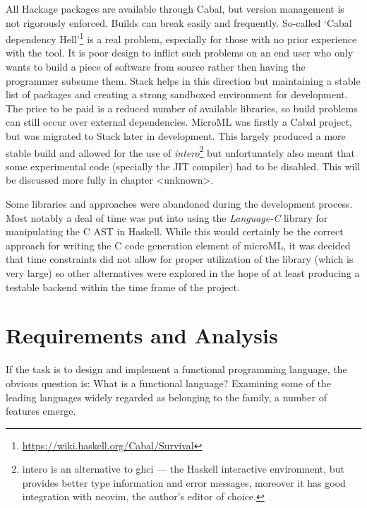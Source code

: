 \documentclass[12pt, a4paper]{report}
\begin{document}
All Hackage packages are available through Cabal, but version management is not rigorously
enforced. Builds can break easily and frequently. So-called `Cabal dependency
Hell'\footnote{\url{https://wiki.haskell.org/Cabal/Survival}} is a real problem, especially for
those with no prior experience with the tool. It is poor design to inflict such problems on an end
user who only wants to build a piece of software from source rather then having the programmer
subsume them. Stack helps in this direction but maintaining a stable list of packages and creating a
strong sandboxed environment for development. The price to be paid is a reduced number of available
libraries, so build problems can still occur over external dependencies. MicroML was firstly a Cabal
project, but was migrated to Stack later in development. This largely produced a more stable
build and allowed for the use of \textit{intero}\footnote{intero is an alternative to ghci --- the
    Haskell interactive environment, but provides better type information and error messages,
    moreover it has good integration with neovim, the author's editor of choice.} but unfortunately also meant that some experimental
code (specially the JIT compiler) had to be disabled. This will be discussed more fully in chapter
<unknown>.

Some libraries and approaches were abandoned during the development process. Most notably a deal of
time was put into using the \textit{Language-C} library for manipulating the C AST in Haskell. While
this would certainly be the correct approach for writing the C code generation element of microML,
it was decided that time constraints did not allow for proper utilization of the library (which is
very large) so other alternatives were explored in the hope of at least producing a testable backend
within the time frame of the project. 


\chapter{Requirements and Analysis}

If the task is to design and implement a functional programming language, the obvious question is: What is a functional language? 
Examining some of the leading languages widely regarded as belonging to the family, a number of
features emerge.
\end{document}
